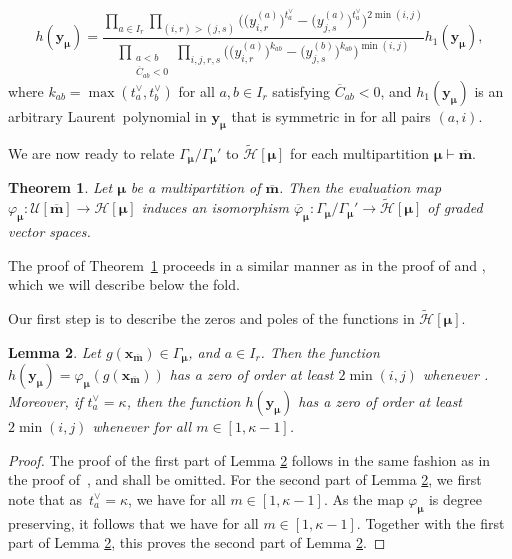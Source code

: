 \documentclass[10pt,a4paper]{amsart}
\numberwithin{equation}{section}
\newtheorem{Theorem}{Theorem}[section]
\newtheorem{Lemma}[Theorem]{Lemma}
\begin{document}
\begin{equation}\label{eq:3.24}
h(\mathbf{y}_{\bm{\mu}})
=\frac{\prod_{a\in I_r}\prod_{(i,r)>(j,s)}\bigl(\bigl(y_{i,r}^{(a)}\bigr)^{t_a^{\vee}}-\bigl(y_{j,s}^{(a)}\bigr) ^{t_a^{\vee}})^{2\min(i,j)}}{\prod_{\substack{a<b \\\overline{C}_{ab}<0}} \prod_{i,j,r,s}\bigl(\bigl(y_{i,r}^{(a)}\bigr) ^{k_{ab}}-\bigl(y_{j,s}^{(b)}\bigr)^{k_{ab}}\bigr)^{\min(i,j)}} h_1(\mathbf{y}_{\bm{\mu}}),
\end{equation}
where $k_{ab}=\max(t_a^{\vee},t_b^{\vee})$ for all $a,b\in I_r$ satisfying $\overline{C}_{ab}<0$, and $h_1(\mathbf{y}_{\bm{\mu}})$ is an arbitrary Laurent~polynomial in $\mathbf{y}_{\bm{\mu}}$ that is symmetric in  for all pairs $(a,i)$.

We are now ready to relate $\Gamma_{\bm{\mu}}/ \Gamma_{\bm{\mu}}'$ to $\tilde{\mathcal{H}}[\bm{\mu}]$ for each multipartition $\bm{\mu}\vdash\overline{\mathbf{m}}$.

\begin{Theorem}\label{3.4}
Let $\bm{\mu}$ be a multipartition of $\overline{\mathbf{m}}$. Then the evaluation map $\varphi_{\bm{\mu}}\colon\mathcal{U}[\overline{\mathbf{m}}]\to \mathcal{H}[\bm{\mu}]$ induces an isomorphism $\overline{\varphi}_{\bm{\mu}}\colon\Gamma_{\bm{\mu}}/ \Gamma_{\bm{\mu}}'\to\tilde{\mathcal{H}}[\bm{\mu}]$ of graded vector spaces.
\end{Theorem}

The proof of Theorem~\ref{3.4} proceeds in a similar manner as in the proof of \cite[Theorem 3.6]{AKS06} and \cite[Theorem 4.1]{AK07}, which we will describe below the fold.

Our first step is to describe the zeros and poles of the functions in $\tilde{\mathcal{H}}[\bm{\mu}]$.

\begin{Lemma}\label{3.5}
Let $g(\mathbf{x}_{\overline{\mathbf{m}}})\in \Gamma_{\bm{\mu}}$, and $a\in I_r$. Then the function $h(\mathbf{y}_{\bm{\mu}})=\varphi_{\bm{\mu}}(g(\mathbf{x}_{\overline{\mathbf{m}}}))$ has a zero of order at least $2\min(i,j)$ whenever . Moreover, if $t_a^{\vee}=\kappa$, then the function $h(\mathbf{y}_{\bm{\mu}})$ has a zero of order at least $2\min(i,j)$ whenever  for all $m\in[1,\kappa-1]$.
\end{Lemma}

\begin{proof}
The proof of the first part of Lemma \ref{3.5} follows in the same fashion as in the proof of~\cite[Lemma 3.7]{AKS06}, and shall be omitted. For the second part of Lemma \ref{3.5}, we first note that as~${t_a^{\vee}=\kappa}$, we have  for all $m\in [1,\kappa-1]$. As the map $\varphi_{\bm{\mu}}$ is degree preserving, it follows that we have  for all $m\in [1,\kappa-1]$. Together with the first part of Lemma \ref{3.5}, this proves the second part of Lemma \ref{3.5}.
\end{proof}
\end{document}
